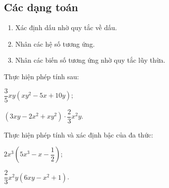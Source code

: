 \subsection{Các dạng toán}
\begin{dang}
\begin{enumerate}[\tickEX]
	\item Xác định dấu nhờ quy tắc về dấu.
	\item Nhân các hệ số tương ứng.
	\item Nhân các biến số tương ứng nhờ quy tắc lũy thừa.
\end{enumerate}
\end{dang}
\begin{vd}
	Thực hiện phép tính sau:
	\begin{listEX}[2]
		\item $\dfrac{3}{5}xy(xy^{2}-5x+10y)$;
		\item $ \left(3xy-2x^{2}+xy^{2}\right)\cdot \dfrac{2}{3}x^{2}y $.
	\end{listEX}
\end{vd}
\begin{vd}
	Thực hiện phép tính và xác định bậc của đa thức:
	\begin{listEX}[2]
		\item $ 2x^{3}\left(5x^{3}-x-\dfrac{1}{2}\right) $;
		\item $\dfrac{2}{3}x^{2}y(6xy-x^{2}+1)$.
	\end{listEX}
\end{vd}

